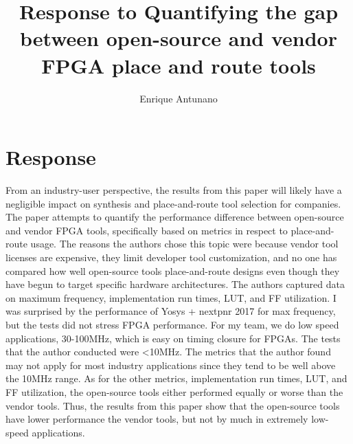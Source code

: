 \documentclass{article}
\title{Response to Quantifying the gap between open-source and
vendor FPGA place and route tools}
\author{Enrique Antunano}
\begin{document}
\maketitle

\section{Response}

From an industry-user perspective, the results from this paper will likely have a negligible impact on synthesis and place-and-route tool selection for companies. 
The paper attempts to quantify the performance difference between open-source and vendor FPGA tools, specifically based on metrics in respect to place-and-route usage. 
The reasons the authors chose this topic were because vendor tool licenses are expensive, they limit developer tool customization, and no one has compared how well open-source tools place-and-route designs even though they have begun to target specific hardware architectures. 
The authors captured data on maximum frequency, implementation run times, LUT, and FF utilization. 
I was surprised by the performance of Yosys + nextpnr 2017 for max frequency, but the tests did not stress FPGA performance. 
For my team, we do low speed applications, 30-100MHz, which is easy on timing closure for FPGAs. The tests that the author conducted were <10MHz. 
The metrics that the author found may not apply for most industry applications since they tend to be well above the 10MHz range. 
As for the other metrics, implementation run times, LUT, and FF utilization, the open-source tools either performed equally or worse than the vendor tools. 
Thus, the results from this paper show that the open-source tools have lower performance the vendor tools, but not by much in extremely low-speed applications.
\end{document}
